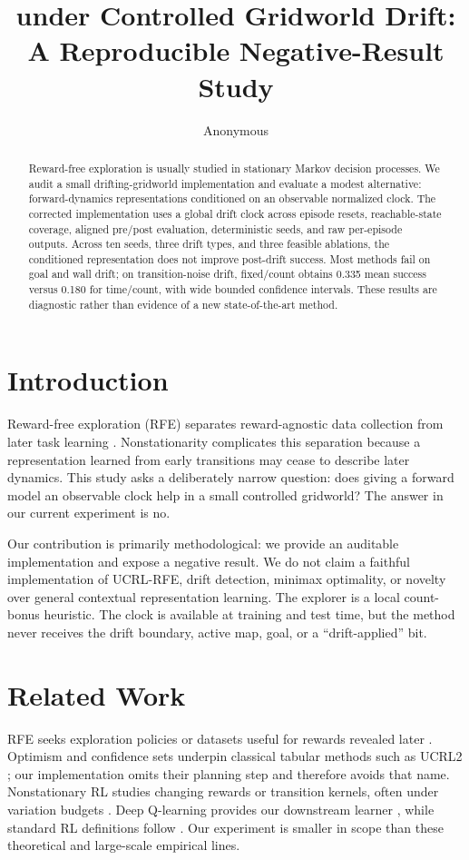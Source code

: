 \documentclass[10pt]{article}
\title{\method{} under Controlled Gridworld Drift:\\A Reproducible Negative-Result Study}
\author{Anonymous}
\date{}
\begin{document}
\maketitle

\begin{abstract}
Reward-free exploration is usually studied in stationary Markov decision
processes.  We audit a small drifting-gridworld implementation and evaluate a
modest alternative: forward-dynamics representations conditioned on an
observable normalized clock.  The corrected implementation uses a global drift
clock across episode resets, reachable-state coverage, aligned pre/post
evaluation, deterministic seeds, and raw per-episode outputs.  Across ten
seeds, three drift types, and three feasible ablations, the conditioned
representation does not improve post-drift success.  Most methods fail on goal
and wall drift; on transition-noise drift, fixed/count obtains 0.335 mean
success versus 0.180 for time/count, with wide bounded confidence intervals.
These results are diagnostic rather than evidence of a new state-of-the-art
method.
\end{abstract}

\section{Introduction}
Reward-free exploration (RFE) separates reward-agnostic data collection from
later task learning \citep{jin2020rewardfree}.  Nonstationarity complicates this
separation because a representation learned from early transitions may cease to
describe later dynamics.  This study asks a deliberately narrow question:
does giving a forward model an observable clock help in a small controlled
gridworld?  The answer in our current experiment is no.

Our contribution is primarily methodological: we provide an auditable
implementation and expose a negative result.  We do not claim a faithful
implementation of UCRL-RFE, drift detection, minimax optimality, or novelty over
general contextual representation learning.  The explorer is a local
count-bonus heuristic.  The clock is available at training and test time, but
the method never receives the drift boundary, active map, goal, or a
``drift-applied'' bit.

\section{Related Work}
RFE seeks exploration policies or datasets useful for rewards revealed later
\citep{jin2020rewardfree}.  Optimism and confidence sets underpin classical
tabular methods such as UCRL2 \citep{jaksch2010near}; our implementation omits
their planning step and therefore avoids that name.  Nonstationary RL studies
changing rewards or transition kernels, often under variation budgets
\citep{cheung2020nonstationary}.  Deep Q-learning provides our downstream
learner \citep{mnih2015human}, while standard RL definitions follow
\citet{sutton2018reinforcement}.  Our experiment is smaller in scope than these
theoretical and large-scale empirical lines.
\end{document}
